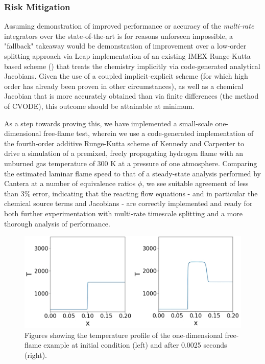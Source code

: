 \subsubsection{Risk Mitigation}

Assuming demonstration of improved
performance or accuracy of the \emph{multi-rate} integrators over the
state-of-the-art is for reasons unforseen impossible, a "fallback" takeaway
would be demonstration of improvement over a low-order splitting
approach via Leap implementation of an existing IMEX Runge-Kutta based scheme
(\cite{kennedy2003additive}) that treats the chemistry implicitly via code-generated
analytical Jacobians. Given the use of a coupled implicit-explicit scheme
(for which high order has already been proven in other circumstances),
as well as a chemical Jacobian that is more accurately obtained than via finite
differences (the method of CVODE), this outcome should be attainable at minimum.

As a step towards proving this, we have implemented a small-scale one-dimensional
free-flame test, wherein we use a code-generated implementation of the fourth-order
additive Runge-Kutta scheme of Kennedy and Carpenter to drive a simulation of
a premixed, freely propagating hydrogen flame with an unburned gas temperature
of 300 K at a pressure of one atmosphere. Comparing the estimated laminar
flame speed to that of a steady-state analysis performed by Cantera at a number
of equivalence ratios $\phi$, we see suitable agreement of less than 3\% error, indicating
that the reacting flow equations - and in particular the chemical source terms and Jacobians -
are correctly implemented and ready for both further experimentation with multi-rate
timescale splitting and a more thorough analysis of performance.
\begin{figure}
\centering
\includegraphics[width=0.8\linewidth,trim=4 4 4 4,clip]{figures/flame_figures.png}
\caption{Figures showing the temperature profile of the one-dimensional free-flame example
         at initial condition (left) and after 0.0025 seconds (right).}
\label{fig:freeflame_output}
\end{figure}

